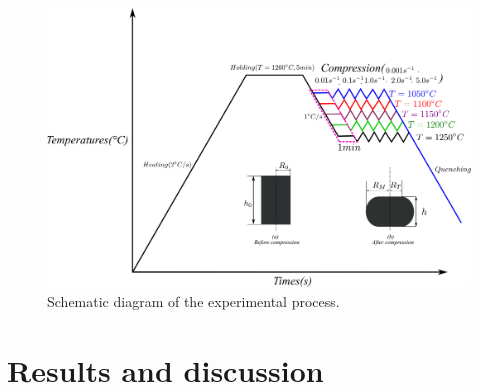 \documentclass[twoside,english,1p,final,sort&compress]{elsarticle}
\theoremstyle{plain}
\begin{document}
\begin{figure}[!ht]
\centering
\includegraphics[width=0.9\columnwidth]
{newFigures/GleebleDesign}
\caption{Schematic diagram of the experimental process.}
\label{fig:Heating}
\end{figure}
\begin{table}[h!]
\centering{}
\caption{Chemical Composition of the AISI P20 Steel (Weight Percent)}
\end{table}
\section{Results and discussion\label{sec:ConstLaws}}

\end{document}
